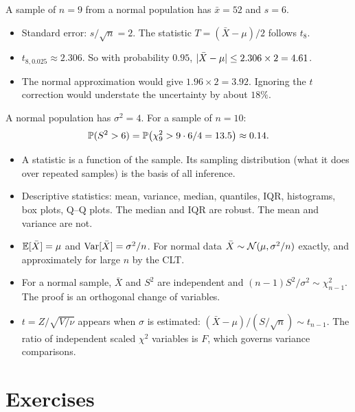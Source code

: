 \begin{example}
A sample of $n=9$ from a normal population has $\bar{x}=52$ and $s=6$.
\begin{itemize}
  \item Standard error: $s/\sqrt n=2$. The statistic $T=(\bar{X}-\mu)/2$ follows $t_8$.
  \item $t_{8,0.025}\approx2.306$. So with probability $0.95$, $\lvert\bar{X}-\mu\rvert\le2.306\times2=4.61$.
  \item The normal approximation would give $1.96\times2=3.92$. Ignoring the $t$ correction would understate the uncertainty by about $18\%$.
\end{itemize}
\end{example}

\begin{example}
A normal population has $\sigma^2=4$. For a sample of $n=10$:
\[ \mathbb{P}(S^2>6)=\mathbb{P}\big(\chi^2_9>9\cdot6/4=13.5\big)\approx0.14. \]
\end{example}

\begin{summarybox}
\begin{itemize}
  \item A statistic is a function of the sample. Its sampling distribution (what it does over repeated samples) is the basis of all inference.
  \item Descriptive statistics: mean, variance, median, quantiles, IQR, histograms, box plots, Q--Q plots. The median and IQR are robust. The mean and variance are not.
  \item $\mathbb{E}[\bar{X}]=\mu$ and $\operatorname{Var}[\bar{X}]=\sigma^2/n$. For normal data $\bar{X}\sim\mathcal{N}(\mu,\sigma^2/n)$ exactly, and approximately for large $n$ by the CLT.
  \item For a normal sample, $\bar{X}$ and $S^2$ are independent and $(n-1)S^2/\sigma^2\sim\chi^2_{n-1}$. The proof is an orthogonal change of variables.
  \item $t=Z/\sqrt{V/\nu}$ appears when $\sigma$ is estimated: $(\bar{X}-\mu)/(S/\sqrt n)\sim t_{n-1}$. The ratio of independent scaled $\chi^2$ variables is $F$, which governs variance comparisons.
\end{itemize}
\end{summarybox}

\section{Exercises}

